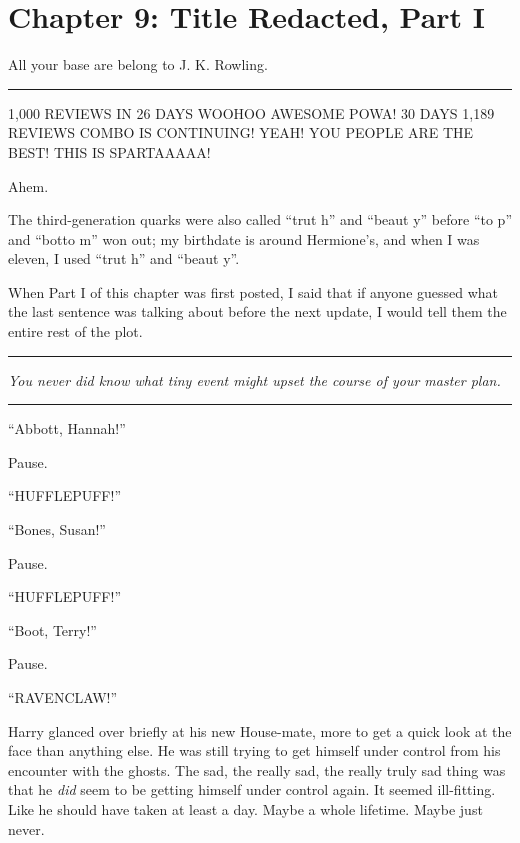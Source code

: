 \chapter{Chapter 9: Title Redacted, Part I}
All your base are belong to J. K. Rowling.

\begin{center}\rule{3in}{0.4pt}\end{center}

1,000 REVIEWS IN 26 DAYS WOOHOO AWESOME POWA! 30 DAYS 1,189 REVIEWS COMBO IS CONTINUING! YEAH! YOU PEOPLE ARE THE BEST! THIS IS SPARTAAAAA!

Ahem.

The third-generation quarks were also called ``trut h'' and ``beaut y'' before ``to p'' and ``botto m'' won out; my birthdate is around Hermione's, and when I was eleven, I used ``trut h'' and ``beaut y''.

When Part I of this chapter was first posted, I said that if anyone guessed what the last sentence was talking about before the next update, I would tell them the entire rest of the plot.

\begin{center}\rule{3in}{0.4pt}\end{center}

\emph{You never did know what tiny event might upset the course of your master plan.}

\begin{center}\rule{3in}{0.4pt}\end{center}

``Abbott, Hannah!''

Pause.

``HUFFLEPUFF!''

``Bones, Susan!''

Pause.

``HUFFLEPUFF!''

``Boot, Terry!''

Pause.

``RAVENCLAW!''

Harry glanced over briefly at his new House-mate, more to get a quick look at the face than anything else. He was still trying to get himself under control from his encounter with the ghosts. The sad, the really sad, the really truly sad thing was that he \emph{did} seem to be getting himself under control again. It seemed ill-fitting. Like he should have taken at least a day. Maybe a whole lifetime. Maybe just never.

